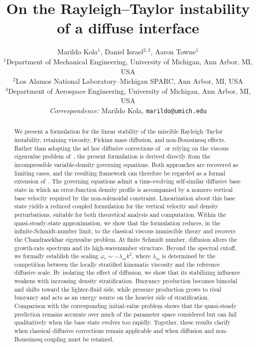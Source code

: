 \documentclass[11pt]{article}
\title{On the Rayleigh--Taylor instability of a diffuse interface}
\author{%
  Marildo Kola$^{1}$, Daniel Israel$^{2,3}$, Aaron Towne$^{1}$\\[6pt]
  \small $^{1}$Department of Mechanical Engineering, University of Michigan, Ann Arbor, MI, USA\\
  \small $^{2}$Los Alamos National Laboratory--Michigan SPARC, Ann Arbor, MI, USA\\
  \small $^{3}$Department of Aerospace Engineering, University of Michigan, Ann Arbor, MI, USA\\[4pt]
  \small\textit{Correspondence:} Marildo Kola, \texttt{marildo@umich.edu}%
}
\date{}
\begin{document}
\maketitle

    
\begin{abstract}
We present a formulation for the linear stability of the miscible Rayleigh--Taylor instability, retaining viscosity, Fickian mass diffusion, and non-Boussinesq effects. Rather than adopting the ad hoc diffusive corrections of~\citet{duff-harlow-hirt-1962} or relying on the viscous eigenvalue problem of~\citet{chandrasekhar-1961}, the present formulation is derived directly from the incompressible variable-density governing equations. Both approaches are recovered as limiting cases, and the resulting framework can therefore be regarded as a formal extension of~\citet{morgan-likhachev-jacobs-2016}.
The governing equations admit a time-evolving self-similar diffusive base state in which an error-function density profile is accompanied by a nonzero vertical base velocity required by the non-solenoidal constraint. Linearization about this base state yields a reduced coupled formulation for the vertical velocity and density perturbations, suitable for both theoretical analysis and computation. Within the quasi-steady-state approximation, we show that the formulation reduces, in the infinite-Schmidt-number limit, to the classical viscous immiscible theory and recovers the Chandrasekhar eigenvalue problem. At finite Schmidt number, diffusion alters the growth-rate spectrum and its high-wavenumber structure. Beyond the spectral cutoff, we formally establish the scaling \(\omega_r \sim -\lambda_m k^2\), where \(\lambda_m\) is determined by the competition between the locally stratified kinematic viscosity and the reference diffusive scale. 
By isolating the effect of diffusion, we show that its stabilizing influence weakens with increasing density stratification. Buoyancy production becomes bimodal and shifts toward the lighter-fluid side, while pressure production grows to rival buoyancy and acts as an energy source on the heavier side of stratification. 
Comparison with the corresponding initial-value problem shows that the quasi-steady prediction remains accurate over much of the parameter space considered but can fail qualitatively when the base state evolves too rapidly. Together, these results clarify when classical diffusive corrections remain applicable and when diffusion and non-Boussinesq coupling must be retained.
\end{abstract}
\end{document}
